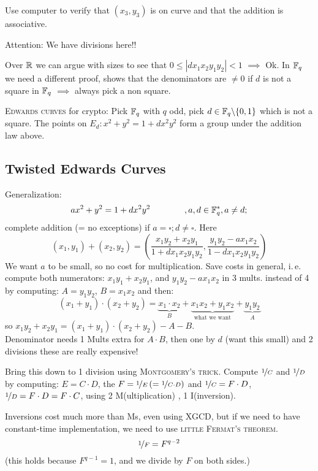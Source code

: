 Use computer to verify that $(x_3,y_3)$ is on curve and that the addition is associative.

Attention: We have divisions here!!

Over $\mathbb{R}$ we can argue with sizes to see that $0 \leq |dx_1x_2y_1y_2|<1$ $\implies$ Ok. In $\mathbb{F}_q$ we need a different proof, shows that the denominators are $\neq 0$ if $d$ is not a square in $\mathbb{F}_q$ $\implies$ always pick a non square.

\textsc{Edwards curves} for crypto: Pick $\mathbb{F}_q$ with $q$ odd, pick $d \in \mathbb{F}_q \backslash\{0,1\}$ which is not a square. The points on $E_d: x^2+y^2 = 1 + dx^2y^2$ form a group under the addition law above.

\subsection{Twisted Edwards Curves}

Generalization:
\[
ax^2+y^2=1+dx^2y^2 \qquad \qquad , a, d \in \mathbb{F}_q^{\ast}, a \neq d;
\]
complete addition (= no exceptions) if $a = \square; d \neq \square$. Here 
\[
(x_1,y_1) + (x_2,y_2) = \left(\frac{x_1y_2+x_2y_1}{1+dx_1x_2y_1y_2}, \frac{y_1y_2-ax_1x_2}{1-dx_1x_2y_1y_2}\right)
\]
We want $a$ to be small, so no cost for multiplication. Save costs in general, i.\,e. compute both numerators: $x_1y_1+x_2y_1$, and $y_1y_2-ax_1x_2$ in 3 mults. instead of 4 by computing: $A=y_1y_2$, $B=x_1x_2$ and then:
\[
(x_1+y_1)\cdot(x_2+y_2) = \underbrace{x_1 \cdot x_2}_{B} + \underbrace{x_1x_2+y_1x_2}_{\text{what we want}} + \underbrace{y_1y_2}_{A}
\]
so $x_1y_2 + x_2y_1 = (x_1+y_1)\cdot (x_2+y_2) - A - B$.\\

Denominator needs 1 Mults extra for $A \cdot B$, then one by $d$ (want this small) and 2 divisions these are really expensive!

Bring this down to 1 division using \textsc{Montgomery's trick}. Compute $\nicefrac{1}{C}$ and $\nicefrac{1}{D}$ by computing: $E=C \cdot D$, the $F = \nicefrac{1}{E} \left( = \nicefrac{1}{C \cdot  D} \right)$ and $\nicefrac{1}{C} = F \cdot D$, $\nicefrac{1}{D} = F \cdot D = F \cdot C$, using 2 M(ultiplication) , 1 I(inversion).

Inversions cost much more than Ms, even using \textsc{XGCD}, but if we need to have constant-time implementation, we need to use \textsc{little Fermat's theorem}.
\[
\nicefrac{1}{F} = F^{q-2}
\]
(this holds because $F^{q-1} = 1$, and we divide by $F$ on both sides.)

